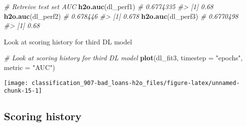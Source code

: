 \documentclass[]{book}
\newenvironment{Shaded}{\begin{snugshade}}{\end{snugshade}}
\newcommand{\CommentTok}[1]{\textcolor[rgb]{0.56,0.35,0.01}{\textit{#1}}}
\newcommand{\DataTypeTok}[1]{\textcolor[rgb]{0.13,0.29,0.53}{#1}}
\newcommand{\KeywordTok}[1]{\textcolor[rgb]{0.13,0.29,0.53}{\textbf{#1}}}
\newcommand{\NormalTok}[1]{#1}
\newcommand{\StringTok}[1]{\textcolor[rgb]{0.31,0.60,0.02}{#1}}
\begin{document}
\begin{Shaded}
\begin{Highlighting}[]
\CommentTok{# Retreive test set AUC}
\KeywordTok{h2o.auc}\NormalTok{(dl_perf1)  }\CommentTok{# 0.6774335}
\CommentTok{#> [1] 0.68}
\KeywordTok{h2o.auc}\NormalTok{(dl_perf2)  }\CommentTok{# 0.678446}
\CommentTok{#> [1] 0.678}
\KeywordTok{h2o.auc}\NormalTok{(dl_perf3)  }\CommentTok{# 0.6770498}
\CommentTok{#> [1] 0.68}
\end{Highlighting}
\end{Shaded}

Look at scoring history for third DL model

\begin{Shaded}
\begin{Highlighting}[]
\CommentTok{# Look at scoring history for third DL model}
\KeywordTok{plot}\NormalTok{(dl_fit3, }
     \DataTypeTok{timestep =} \StringTok{"epochs"}\NormalTok{, }
     \DataTypeTok{metric =} \StringTok{"AUC"}\NormalTok{)}
\end{Highlighting}
\end{Shaded}

\begin{center}\texttt{[image: classification\_907-bad\_loans-h2o\_files/figure-latex/unnamed-chunk-15-1]} \end{center}

\hypertarget{scoring-history}{%
\subsection{Scoring history}\label{scoring-history}}
\end{document}
